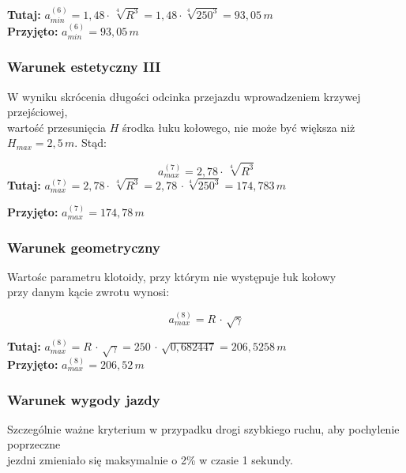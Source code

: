 \documentclass[12pt]{article}
\begin{document}
            \textbf{Tutaj:} \( a_{min}^{(6)}=1,48 \cdot\, \sqrt[4]{R^{3}} = 1,48 \cdot \sqrt[4]{250^{3}} = 93,05\,m \)\\

            \textbf{Przyjęto:} \( a_{min}^{(6)}=93,05\,m \)
            \newpage
        
        \subsubsection{Warunek estetyczny III}
            W wyniku skrócenia długości odcinka przejazdu wprowadzeniem krzywej przejściowej,\\
            wartość przesunięcia \(H\) środka łuku kołowego, nie może być większa niż \( H_{max}=2,5\,m \). Stąd:

            \begin{equation}
                a_{max}^{(7)}=2,78 \cdot\, \sqrt[4]{R^{3}}
            \end{equation}
            \newline
            \textbf{Tutaj:} \( a_{max}^{(7)} = 2,78 \cdot\, \sqrt[4]{R^{3}} = 2,78 \,\cdot \sqrt[4]{250^{3}} = 174,783\,m\)
            \newline

            \textbf{Przyjęto:} \( a_{max}^{(7)} = 174,78\,m \)

        \subsubsection{Warunek geometryczny}
            Wartośc parametru klotoidy, przy którym nie występuje łuk kołowy\\
            przy danym kącie zwrotu wynosi:
            
            \begin{equation}
                a^{(8)}_{max} = R \,\cdot\, \sqrt{\gamma}
            \end{equation}

            \textbf{Tutaj:} \( a^{(8)}_{max} = R \,\cdot\, \sqrt{\gamma}  = 250 \,\cdot\, \sqrt{0,682447} = 206,5258 \,m \)\\

            \textbf{Przyjęto:} \( a^{(8)}_{max} = 206,52 \,m \)

        \subsubsection{Warunek wygody jazdy}
            Szczególnie ważne kryterium w przypadku drogi szybkiego ruchu, aby pochylenie poprzeczne\\
            jezdni zmieniało się maksymalnie o 2\% w czasie 1 sekundy.
\end{document}
